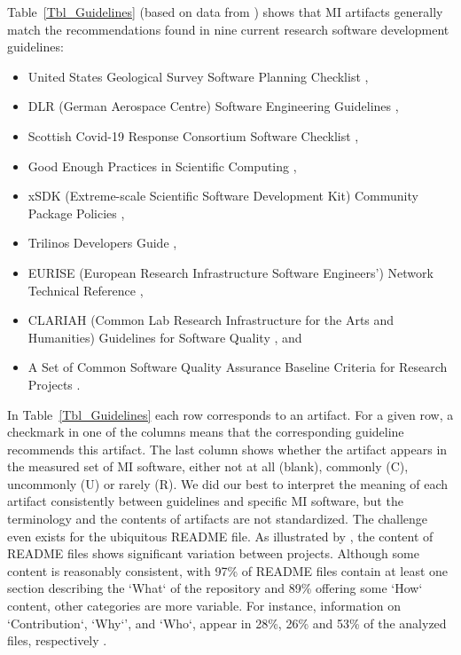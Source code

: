 \documentclass[final, 3p, times, authoryear]{elsarticle}
\begin{document}
Table~\ref{Tbl_Guidelines} (based on data from \citep{SmithAndMichalski2022})
shows that MI artifacts generally match the recommendations found in nine
current research software development guidelines:
\begin{itemize}
\item United States Geological Survey Software Planning Checklist
\citep{USGS2019},
\item DLR (German Aerospace Centre) Software Engineering Guidelines
\citep{TobiasEtAl2018}, 
\item Scottish Covid-19 Response Consortium Software Checklist
\citep{BrettEtAl2021},
\item Good Enough Practices in Scientific Computing \citep{WilsonEtAl2016},
\item xSDK (Extreme-scale Scientific Software Development Kit) Community Package
Policies \citep{SmithAndRoscoe2018},
\item Trilinos Developers Guide \citep{HerouxEtAl2008},
\item EURISE (European Research Infrastructure Software Engineers') Network
Technical Reference \citep{ThielEtAl2020},
\item CLARIAH (Common Lab Research Infrastructure for the Arts and Humanities)
Guidelines for Software Quality \citep{vanGompelEtAl2016}, and
\item A Set of Common Software Quality Assurance Baseline Criteria for Research
Projects \citep{OrvizEtAl2017}.
\end{itemize}

In Table~\ref{Tbl_Guidelines} each row corresponds to an artifact.  For a given
row, a checkmark in one of the columns means that the corresponding guideline
recommends this artifact.  The last column shows whether the artifact appears in
the measured set of MI software, either not at all (blank), commonly (C),
uncommonly (U) or rarely (R).  We did our best to interpret the meaning of each
artifact consistently between guidelines and specific MI software, but the
terminology and the contents of artifacts are not standardized.  The challenge
even exists for the ubiquitous README file.  As illustrated by
\citet{PranaEtAl2018}, the content of README files shows significant variation
between projects.  Although some content is reasonably consistent, with 97\% of
README files contain at least one section describing the `What` of the
repository and 89\% offering some `How` content, other categories are more
variable.  For instance, information on `Contribution`, `Why`', and `Who`,
appear in 28\%, 26\% and 53\% of the analyzed files, respectively
\citep{PranaEtAl2018}.  
\end{document}
